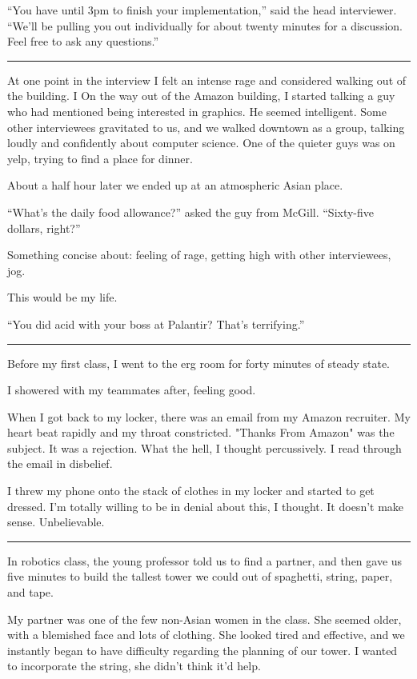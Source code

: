 ``You have until 3pm to finish your implementation,'' said the head interviewer.
``We'll be pulling you out individually for about twenty minutes for a
discussion.  Feel free to ask any questions.''

\plainfancybreak{12pt}{2}{* * *}

At one point in the interview I felt an intense rage and considered walking out
of the building.  I
On the way out of the Amazon building, I started talking a guy who had mentioned
being interested in graphics.  He seemed intelligent.  Some other interviewees
gravitated to us, and we walked downtown as a group, talking loudly and
confidently about computer science.  One of the quieter guys was on yelp, trying
to find a place for dinner.

About a half hour later we ended up at an atmospheric Asian place.

``What's the daily food allowance?'' asked the guy from McGill. ``Sixty-five
dollars, right?''

Something concise about: feeling of rage, getting high with other interviewees, jog.

This would be my life.

``You did acid with your boss at Palantir?  That's terrifying.''

\fancybreak{***}

Before my first class, I went to the erg room for forty minutes of steady state.

I showered with my teammates after, feeling good.

When I got back to my locker, there was an email from my Amazon recruiter.  My
heart beat rapidly and my throat constricted.  "Thanks From Amazon" was the
subject.  It was a rejection.  What the hell, I thought percussively.  I read
through the email in disbelief.

I threw my phone onto the stack of clothes in my locker and started to get
dressed.  I'm totally willing to be in denial about this, I thought.  It doesn't
make sense.  Unbelievable.

\fancybreak{***}

In robotics class, the young professor told us to find a partner, and then gave
us five minutes to build the tallest tower we could out of spaghetti, string,
paper, and tape.

My partner was one of the few non-Asian women in the class.  She seemed older,
with a blemished face and lots of clothing.  She looked tired and effective, and
we instantly began to have difficulty regarding the planning of our tower.  I
wanted to incorporate the string, she didn't think it'd help.

